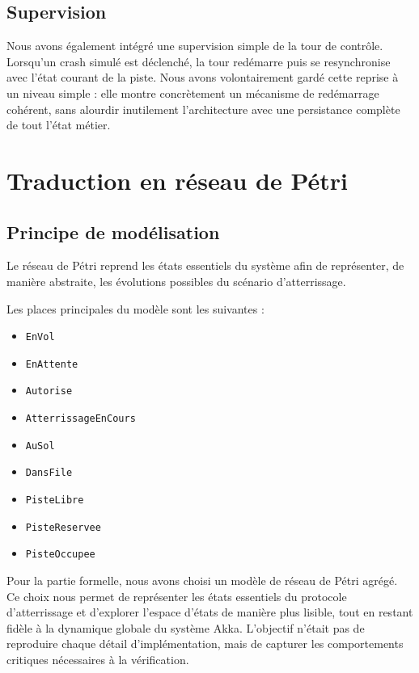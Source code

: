 \documentclass[11pt,a4paper]{article}
\begin{document}
\subsection{Supervision}

Nous avons également intégré une supervision simple de la tour de contrôle. Lorsqu'un crash simulé est déclenché, la tour redémarre puis se resynchronise avec l'état courant de la piste. Nous avons volontairement gardé cette reprise à un niveau simple : elle montre concrètement un mécanisme de redémarrage cohérent, sans alourdir inutilement l'architecture avec une persistance complète de tout l'état métier.

\section{Traduction en réseau de Pétri}

\subsection{Principe de modélisation}

Le réseau de Pétri reprend les états essentiels du système afin de représenter, de manière abstraite, les évolutions possibles du scénario d'atterrissage.

Les places principales du modèle sont les suivantes :
\begin{itemize}
    \item \texttt{EnVol}
    \item \texttt{EnAttente}
    \item \texttt{Autorise}
    \item \texttt{AtterrissageEnCours}
    \item \texttt{AuSol}
    \item \texttt{DansFile}
    \item \texttt{PisteLibre}
    \item \texttt{PisteReservee}
    \item \texttt{PisteOccupee}
\end{itemize}

Pour la partie formelle, nous avons choisi un modèle de réseau de Pétri agrégé. Ce choix nous permet de représenter les états essentiels du protocole d'atterrissage et d'explorer l'espace d'états de manière plus lisible, tout en restant fidèle à la dynamique globale du système Akka. L'objectif n'était pas de reproduire chaque détail d'implémentation, mais de capturer les comportements critiques nécessaires à la vérification.
\end{document}
